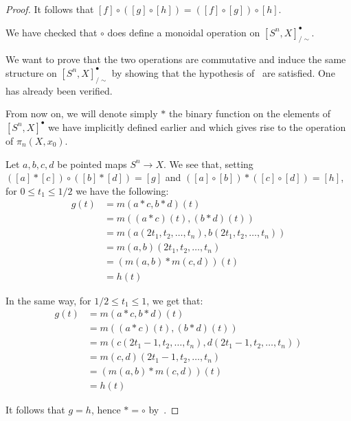 \documentclass{article}
\begin{document}
\begin{proof}
It follows that $[f]\circ ([g]\circ [h])=([f]\circ [g])\circ [h]$.
	
	We have checked that $\circ$ does define a monoidal operation on $[S^n,X]^{\bullet}_{/\sim}$.
	
	We want to prove that the two operations are commutative and induce the same structure on $[S^n,X]^{\bullet}_{/\sim}$ by showing that the hypothesis of~\cite[lemma 6.18]{HM19} are satisfied. One has already been verified.
	
	From now on, we will denote simply $*$ the binary function on the elements of $[S^n,X]^{\bullet}$ we have implicitly defined earlier and which gives rise to the operation of $\pi_n(X,x_0)$.
	
	Let $a,b,c,d$ be pointed maps $S^n\rightarrow X$. We see that, setting $([a]*[c])\circ ([b]*[d])=[g]$ and $([a]\circ [b])*([c]\circ [d])=[h]$, for $0\leq t_1\leq 1/2$ we have the following:
	\begin{align*}
		g(t) &=m(a*c,b*d)(t) \\
		&=m((a*c)(t),(b*d)(t)) \\
		&=m(a(2t_1,t_2,\ldots,t_n),b(2t_1,t_2,\ldots,t_n)) \\
		&=m(a,b)(2t_1,t_2,\ldots,t_n) \\
		&=(m(a,b)*m(c,d))(t) \\
		&=h(t)
	\end{align*}
	
	In the same way, for $1/2\leq t_1\leq 1$, we get that:
	\begin{align*}
		g(t) &=m(a*c,b*d)(t) \\
		&=m((a*c)(t),(b*d)(t)) \\
		&=m(c(2t_1-1,t_2,\ldots,t_n),d(2t_1-1,t_2,\ldots,t_n)) \\
		&=m(c,d)(2t_1-1,t_2,\ldots,t_n) \\
		&=(m(a,b)*m(c,d))(t) \\
		&=h(t)
	\end{align*}
	
	It follows that $g=h$, hence $*=\circ$ by~\cite[lemma 6.18]{HM19}.
\end{proof}

\printbibliography
\end{document}
